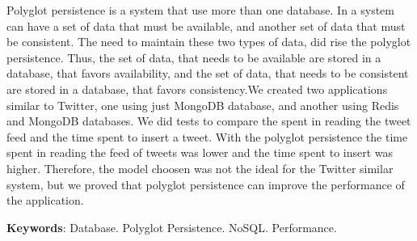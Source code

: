 %
%

\begin{resumo}[Abstract]


Polyglot persistence is a system that use more than one database. In a system can have a set of data that must be available, and another set of data that must be consistent. The need to maintain these two types of data, did rise the polyglot persistence. Thus, the set of data, that needs to be available are stored in a database, that favors availability, and the set of data, that needs to be consistent are stored in a database, that favors consistency.We created two applications similar to Twitter, one using just MongoDB database, and another using Redis and MongoDB databases. We did tests to compare the spent in reading the tweet feed and the time spent to insert a tweet. With the polyglot persistence the time spent in reading the feed of tweets was lower and the time spent to insert was higher. Therefore, the model choosen was not the ideal for the Twitter similar system, but we proved that polyglot persistence can improve the performance of the application.

\textbf{Keywords}: Database. Polyglot Persistence. NoSQL. Performance. 

\end{resumo}
